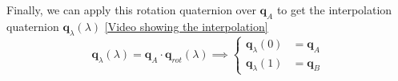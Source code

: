 \documentclass[10pt, aspectratio=169]{beamer}
\theoremstyle{remark}
\theoremstyle{definition}
\begin{document}
\begin{frame}[allowframebreaks]
\begin{enumerate}
\begin{itemize}
        Finally, we can apply this rotation quaternion over $\mathbf{q}_A$ to get the interpolation quaternion $\mathbf{q}_\lambda(\lambda)$  \href{https://eii.cv.uma.es/mod/resource/view.php?id=588130}{[Video showing the interpolation]}
        \begin{equation}
            \mathbf{q}_\lambda(\lambda) = \mathbf{q}_A\cdot\mathbf{q}_{rot}(\lambda) \implies \left\{
            \begin{aligned}
            \mathbf{q}_\lambda(0) & = \mathbf{q}_A \\
            \mathbf{q}_\lambda(1) & = \mathbf{q}_B 
            \end{aligned}
            \right. 
            \label{eq:q_inter}
        \end{equation}

    \end{itemize} 
\end{enumerate}  



\framebreak



 
\end{frame}
\end{document}
